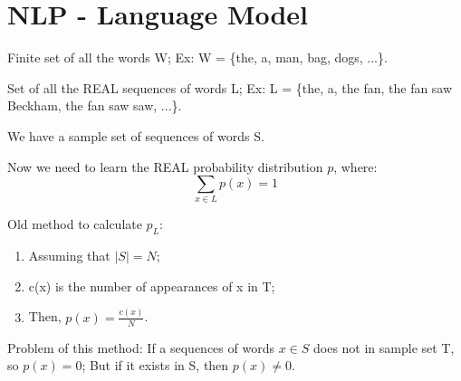 \documentclass[12pt]{article}
\numberwithin{equation}{section}
\begin{document}
\section{NLP - Language Model}
Finite set of all the words W; Ex: W = \{the, a, man, bag, dogs, ...\}. \par
Set of all the REAL sequences of words L; Ex: L = \{the, a, the fan, the fan saw Beckham, the fan saw saw, ...\}.\par
We have a sample set of sequences of words S.\par
Now we need to learn the REAL probability distribution $p$, where:
\[
\sum_{x \in L} p(x) = 1
\]\par
Old method to calculate $p_{L}$:
\begin{enumerate}
	\item Assuming that $|S| = N$;
	\item c(x) is the number of appearances of x in T;
	\item Then, $p(x)=\frac{c(x)}{N} $.
\end{enumerate}
Problem of this method: If a sequences of words $x \in S$ does not in sample set T, so $p(x)=0$;
But if it exists in S, then $p(x) \neq 0$.
\end{document}
